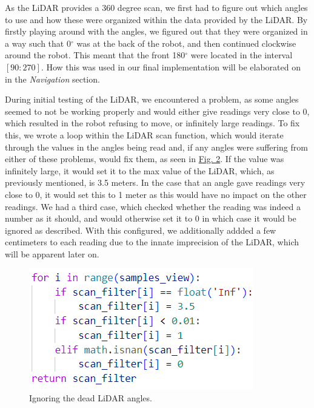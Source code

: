 \documentclass[conference]{IEEEtran}
\begin{document}
As the LiDAR provides a 360 degree scan, we first had to figure out which angles to use and how these were organized within the data provided by the LiDAR.
By firstly playing around with the angles, we figured out that they were organized in a way such that 0$^\circ$ was at the back of the robot, and then continued clockwise around the robot.
This meant that the front 180$^\circ$ were located in the interval $[90:270]$. How this was used in our final implementation will be elaborated on in the \textit{Navigation} section.

During initial testing of the LiDAR, we encountered a problem, as some angles seemed to not be working properly and would either give readings very close to 0, which resulted in the robot refusing to move, or infinitely large readings.
To fix this, we wrote a loop within the LiDAR scan function, which would iterate through the values in the angles being read and, if any angles were suffering from either of these problems, would fix them, as seen in \href{sec:lidar}{Fig. 2}.
If the value was infinitely large, it would set it to the max value of the LiDAR, which, as previously mentioned, is 3.5 meters.
In the case that an angle gave readings very close to 0, it would set this to 1 meter as this would have no impact on the other readings.
We had a third case, which checked whether the reading was indeed a number as it should, and would otherwise set it to 0 in which case it would be ignored as described.
With this configured, we additionally addded a few centimeters to each reading due to the innate imprecision of the LiDAR, which will be apparent later on.
\begin{figure}[htbp]
    \centerline{\includegraphics[width=0.6\columnwidth\hspace{-1.3cm}]{Pictures/LiDARhvid.png}}
    \caption{Ignoring the dead LiDAR angles.}
    \label{sec:lidar}
    \end{figure}
\end{document}
